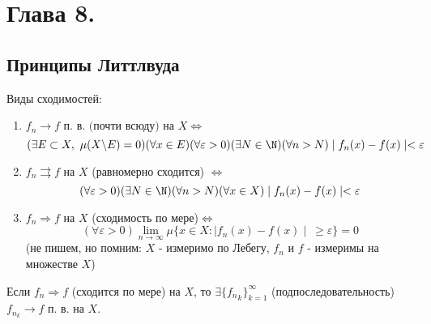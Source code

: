 \setcounter{section}{7}
\section{Глава 8.}
\setcounter{subsection}{6}
\subsection{Принципы Литтлвуда}
Виды сходимостей:
\begin{enumerate}
    \item $f_n \rightarrow f \text{ п. в. (почти всюду) на } X \Leftrightarrow$ $$(\exists E\subset X,\  \mu (X\backslash E)=0)(\forall x \in E)(\forall \varepsilon > 0)(\exists N \in \N)(\forall n>N) \mid f_n(x)-f(x)\mid<\varepsilon$$
    \item $f_n \rightrightarrows f$ на $X$ (равномерно сходится) $\Leftrightarrow$ 
    $$(\forall \varepsilon > 0)(\exists N \in \N)(\forall n>N)(\forall x \in X) \mid f_n(x)-f(x)\mid<\varepsilon$$
    \item $f_n \Rightarrow f$ на $X$ (сходимость по мере)$\Leftrightarrow$
    $$(\forall \varepsilon > 0) \lim_{n\to\infty} \mu \{ x\in X: \mid f_n(x)-f(x)\mid \ \geqslant \varepsilon \} =0$$
    (не пишем, но помним: $X$ - измеримо по Лебегу, $f_n$ и $f$ - измеримы на множестве $X$)
\end{enumerate}
\begin{theorem}[Ф. Рисса]
    Если $f_n \Rightarrow f$ (сходится по мере) на $X$, то $\exists \{{f_n}_k \} ^\infty_{k=1}$ (подпоследовательность) $f_{n_k} \rightarrow f$ п. в. на $X$.
\end{theorem}
